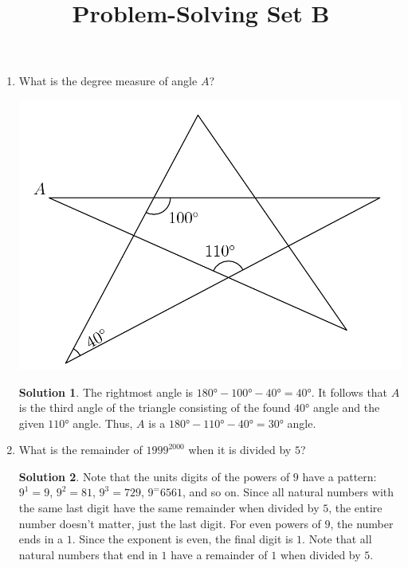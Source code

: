 \documentclass{article}
\title{Problem-Solving Set B}
\author{}
\date{}
\theoremstyle{definition}
\newtheorem*{solution}{Solution}
\begin{document}
\maketitle
\begin{multicols}{2}
    \begin{enumerate}
        \item What is the degree measure of angle $A$?
            \begin{center}
                \includegraphics[scale=0.15]{star.png}
            \end{center}
            \begin{solution}
                The rightmost angle is $\ang{180} - \ang{100} - \ang{40} = \ang{40}$.
                It follows that $A$ is the third angle of the triangle consisting of the found $\ang{40}$ angle and the given $\ang{110}$ angle.
                Thus, $A$ is a $\ang{180} - \ang{110} - \ang{40} = \ang{30}$ angle.
            \end{solution}
        \item What is the remainder of $1999^{2000}$ when it is divided by $5$?
            \begin{solution}
                Note that the units digits of the powers of $9$ have a pattern: $9^1 = 9$, $9^2 = 81$, $9^3 = 729$, $9^ = 6561$, and so on.
                Since all natural numbers with the same last digit have the same remainder when divided by $5$, the entire number doesn't matter, just the last digit.
                For even powers of $9$, the number ends in a $1$.
                Since the exponent is even, the final digit is $1$.
                Note that all natural numbers that end in $1$ have a remainder of $1$ when divided by $5$.

\end{solution}
\end{enumerate}
\end{multicols}
\end{document}
